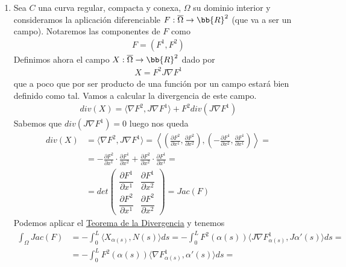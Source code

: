 \begin{observacion}
\begin{enumerate}[start=4]
        \item Sea $C$ una curva regular, compacta y conexa, $\Omega$ su dominio interior y consideramos la aplicación diferenciable $F:\overline{\Omega} \to \bb{R}^2$ (que va a ser un campo). Notaremos las componentes de $F$ como 
        \begin{gather*}
            F=(F^1, F^2)
        \end{gather*}
        Definimos ahora el campo $X:\overline{\Omega}\to \bb{R}^2$ dado por 
        \begin{gather*}
            X = F^2 J \nabla F^1
        \end{gather*}
        que a poco que por ser producto de una función por un campo estará bien definido como tal. Vamos a calcular la divergencia de este campo.
        \begin{gather*}
            div(X) = \langle \nabla F^2, J\nabla F^1 \rangle + F^2div(J\nabla F^1)
        \end{gather*}
        Sabemos que $div(J\nabla F^1)=0$ luego nos queda
        \begin{align*}
            div(X) &= 
            \langle \nabla F^2, J\nabla F^1 \rangle = 
            \left\langle \left(\frac{\partial F^2}{\partial x^1}, \frac{\partial F^2}{\partial x^2} \right) , \left(-\frac{\partial F^1}{\partial x^2}, \frac{\partial F^1}{\partial x^1} \right) \right\rangle =\\
            &=
            - \frac{\partial F^2}{\partial x^1} \cdot \frac{\partial F^1}{\partial x^2} + \frac{\partial F^2}{\partial x^2}\cdot \frac{\partial F^1}{\partial x^1} = \\
            &=
            det 
            \begin{pmatrix}
                \dfrac{\partial F^1}{\partial x^1} & \dfrac{\partial F^1}{\partial x^2}\\
                \dfrac{\partial F^2}{\partial x^1} & \dfrac{\partial F^2}{\partial x^2}
            \end{pmatrix} = Jac(F)
        \end{align*}
        Podemos aplicar el \hyperref[teo:divergencia]{Teorema de la Divergencia} y tenemos
        \begin{align*}
            \int_\Omega Jac(F) &=
            - \int_0^L \langle X_{\alpha(s)}, N(s) \rangle ds =
            - \int_0^L F^2(\alpha(s))\langle J\nabla F^1_{\alpha(s)} , J\alpha'(s)\rangle ds =\\
            &=
            - \int_0^L F^2(\alpha(s)) \langle\nabla F^1_{\alpha(s)}, \alpha'(s) \rangle ds =

\end{align*}
\end{enumerate}
\end{observacion}
